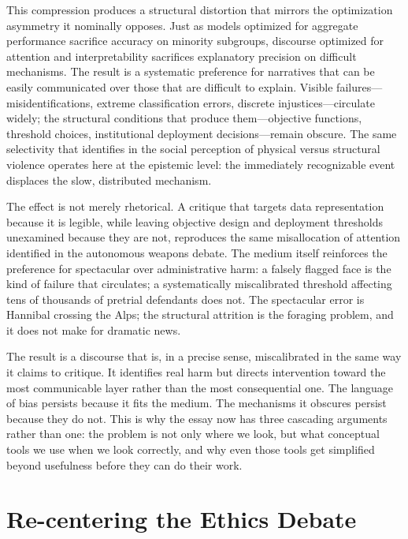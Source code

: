 \documentclass[12pt, a4paper]{article}
\begin{document}
This compression produces a structural distortion that mirrors the optimization asymmetry it nominally opposes. Just as models optimized for aggregate performance sacrifice accuracy on minority subgroups, discourse optimized for attention and interpretability sacrifices explanatory precision on difficult mechanisms. The result is a systematic preference for narratives that can be easily communicated over those that are difficult to explain. Visible failures---misidentifications, extreme classification errors, discrete injustices---circulate widely; the structural conditions that produce them---objective functions, threshold choices, institutional deployment decisions---remain obscure. The same selectivity that \citet{galtung1969} identifies in the social perception of physical versus structural violence operates here at the epistemic level: the immediately recognizable event displaces the slow, distributed mechanism.

The effect is not merely rhetorical. A critique that targets data representation because it is legible, while leaving objective design and deployment thresholds unexamined because they are not, reproduces the same misallocation of attention identified in the autonomous weapons debate. The medium itself reinforces the preference for spectacular over administrative harm: a falsely flagged face is the kind of failure that circulates; a systematically miscalibrated threshold affecting tens of thousands of pretrial defendants does not. The spectacular error is Hannibal crossing the Alps; the structural attrition is the foraging problem, and it does not make for dramatic news.

The result is a discourse that is, in a precise sense, miscalibrated in the same way it claims to critique. It identifies real harm but directs intervention toward the most communicable layer rather than the most consequential one. The language of bias persists because it fits the medium. The mechanisms it obscures persist because they do not. This is why the essay now has three cascading arguments rather than one: the problem is not only where we look, but what conceptual tools we use when we look correctly, and why even those tools get simplified beyond usefulness before they can do their work.

\section{Re-centering the Ethics Debate}
\end{document}
